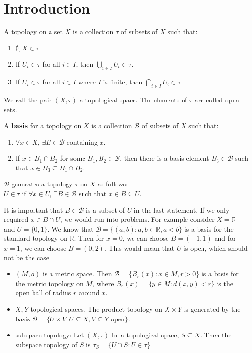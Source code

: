 \section{Introduction}
\begin{definition}
    A topology on a set $X$ is a collection $\tau$ of subsets of $X$ such that:
    \begin{enumerate}\label{1.1}
        \item $\emptyset,X \in \tau$.
        \item If $U_i \in \tau$ for all $i \in I$, then $\bigcup_{i \in I} U_i \in \tau$.
        \item If $U_i \in \tau$ for all $i \in I$ where $I$ is finite, then $\bigcap_{i \in I} U_i \in \tau$.
    \end{enumerate}
    We call the pair $(X,\tau)$ a topological space. The elements of $\tau$ are called open sets.
\end{definition}
\begin{definition}\label{1.2}
    A \textbf{basis} for a topology on $X$ is a collection $\mathcal{B}$ of subsets of $X$ such that:
    \begin{enumerate}
        \item $\forall x \in X$, $\exists B\in \mathcal{B}$ containing $x$.
        \item If $x \in B_1 \cap B_2$ for some $B_1,B_2 \in \mathcal{B}$, then there is a basis element $B_3 \in \mathcal{B}$ such that $x \in B_3 \subseteq B_1 \cap B_2$.
    \end{enumerate}
    $\mathcal{B}$ generates a topology $\tau$ on $X$ as follows: \\
    $U \in \tau$ if $\forall x \in U$, $\exists B \in \mathcal{B}$ such that $x \in B \subseteq U$.
\end{definition}
\begin{remark}\label{1.3}
    It is important that $B\in \mathcal{B}$ is a subset of $U$ in the last statement. If we only required $x \in B \cap U$, we would run into problems. For example consider $X = \mathbb{R}$ and $U=\{0,1\}$. We know that $\mathcal{B}=\{(a,b):a,b\in \mathbb{R}, a<b\}$ is a basis for the standard topology on $\mathbb{R}$. Then for $x=0$, we can choose $B=(-1,1)$ and for $x=1$, we can choose $B=(0,2)$. This would mean that $U$ is open, which should not be the case. 
\end{remark}
\begin{example}\label{1.4}
    \leavevmode
    \begin{itemize}
        \item $(M,d)$ is a metric space. Then $\mathcal{B}=\{B_r(x):x\in M, r>0\}$ is a basis for the metric topology on $M$, where $B_r(x)=\{y\in M:d(x,y)<r\}$ is the open ball of radius $r$ around $x$.
        \item $X,Y$ topological spaces. The product topology on $X\times Y$ is generated by the basis $\mathcal{B}=\{U\times V:U\subseteq X, V\subseteq Y \text{ open}\}$.
        \item subspace topology: Let $(X,\tau)$ be a topological space, $S\subseteq X$. Then the subspace topology of $S$ is $\tau_S=\{U\cap S:U\in \tau\}$.
    \end{itemize}
\end{example}
